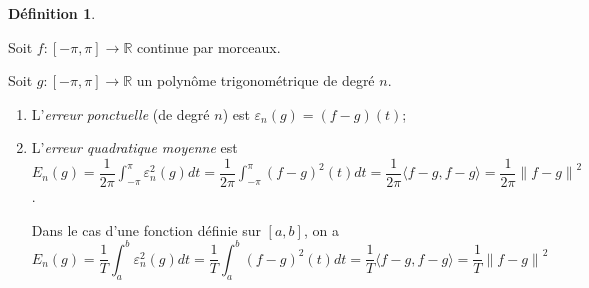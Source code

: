 \documentclass{report}
\newcommand*{\dint}[3]{\displaystyle\int_{#1}^{#2}#3}
\newcommand*{\norme}[1]{\left\| #1 \right\|}
\newcommand*{\eps}{\varepsilon}
\newcommand*{\reels}{\mathbb{R}}
\theoremstyle{definition}
\newtheorem*{defin}{D\'efinition}
\theoremstyle{remark}
\begin{document}
	\begin{defin}~

		Soit $f:[-\pi,\pi] \to \reels$ continue par morceaux.

		Soit $g:[-\pi,\pi] \to \reels$ un polyn\^ome trigonom\'etrique de degr\'e $n$.
		\begin{enumerate}[label=\alph*)]
			\item L'\emph{erreur ponctuelle} (de degr\'e $n$) est $\eps_n(g) = (f-g)(t)$;
			\item L'\emph{erreur quadratique moyenne} est $E_n(g) = \dfrac{1}{2\pi} \dint{-\pi}{\pi}{\eps_n^2(g) dt} = \dfrac{1}{2\pi} \dint{-\pi}{\pi}{(f-g)^2(t) dt} = \dfrac{1}{2\pi} \langle f-g,f-g \rangle = \dfrac{1}{2\pi} \norme{f-g}^2$.

			Dans le cas d'une fonction d\'efinie sur $[a,b]$, on a
			\begin{equation*}%
				E_n(g) = \dfrac{1}{T} \dint{a}{b}{\eps_n^2(g) dt} = \dfrac{1}{T} \dint{a}{b}{(f-g)^2(t) dt} = \dfrac{1}{T} \langle f-g,f-g \rangle = \dfrac{1}{T} \norme{f-g}^2
			\end{equation*}
		\end{enumerate}
	\end{defin}
\end{document}

